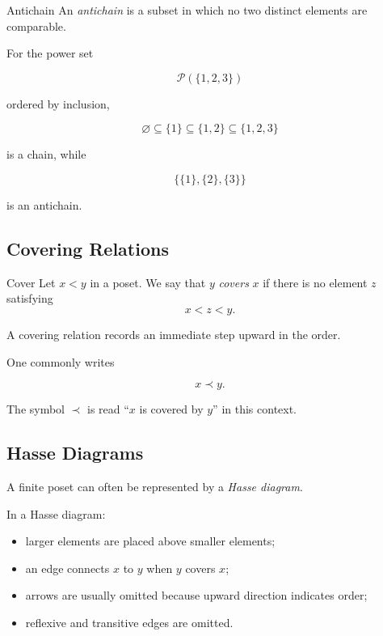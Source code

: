 \begin{definitionbox}{Antichain}
An \emph{antichain} is a subset in which no two distinct elements are
comparable.
\end{definitionbox}

For the power set

\[ \mathcal P(\{1,2,3\}) \]

ordered by inclusion,

\[ \varnothing\subseteq\{1\}\subseteq\{1,2\}\subseteq\{1,2,3\} \]

is a chain, while

\[ \bigl\{\{1\},\{2\},\{3\}\bigr\} \]

is an antichain.

\subsection{Covering Relations}
\label{subsec:covering-relations}

\begin{definitionbox}{Cover}
Let \(x<y\) in a poset. We say that \(y\) \emph{covers} \(x\) if there is no
element \(z\) satisfying
\[ x<z<y. \]
\end{definitionbox}

A covering relation records an immediate step upward in the order.

One commonly writes

\[ x\prec y. \]

The symbol \(\prec\) is read ``\(x\) is covered by \(y\)'' in this context.

\subsection{Hasse Diagrams}
\label{subsec:hasse-diagrams}

A finite poset can often be represented by a \emph{Hasse diagram}.

In a Hasse diagram:

\begin{itemize}
    \item larger elements are placed above smaller elements;
    \item an edge connects \(x\) to \(y\) when \(y\) covers \(x\);
    \item arrows are usually omitted because upward direction indicates order;
    \item reflexive and transitive edges are omitted.
\end{itemize}

